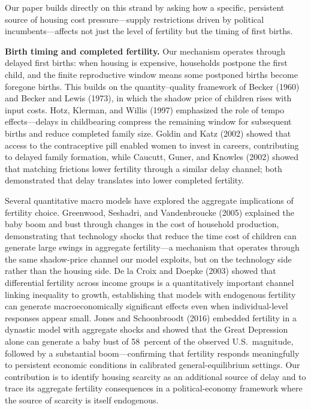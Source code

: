 Our paper builds directly on this strand by asking how a specific, persistent source of housing cost pressure---supply restrictions driven by political incumbents---affects not just the level of fertility but the timing of first births.

\medskip
\noindent\textbf{Birth timing and completed fertility.}
Our mechanism operates through delayed first births: when housing is expensive, households postpone the first child, and the finite reproductive window means some postponed births become foregone births. This builds on the quantity--quality framework of Becker (1960) and Becker and Lewis (1973), in which the shadow price of children rises with input costs. Hotz, Klerman, and Willis (1997) emphasized the role of tempo effects---delays in childbearing compress the remaining window for subsequent births and reduce completed family size. Goldin and Katz (2002) showed that access to the contraceptive pill enabled women to invest in careers, contributing to delayed family formation, while Caucutt, Guner, and Knowles (2002) showed that matching frictions lower fertility through a similar delay channel; both demonstrated that delay translates into lower completed fertility.

Several quantitative macro models have explored the aggregate implications of fertility choice. Greenwood, Seshadri, and Vandenbroucke (2005) explained the baby boom and bust through changes in the cost of household production, demonstrating that technology shocks that reduce the time cost of children can generate large swings in aggregate fertility---a mechanism that operates through the same shadow-price channel our model exploits, but on the technology side rather than the housing side. De la Croix and Doepke (2003) showed that differential fertility across income groups is a quantitatively important channel linking inequality to growth, establishing that models with endogenous fertility can generate macroeconomically significant effects even when individual-level responses appear small. Jones and Schoonbroodt (2016) embedded fertility in a dynastic model with aggregate shocks and showed that the Great Depression alone can generate a baby bust of 58~percent of the observed U.S.\ magnitude, followed by a substantial boom---confirming that fertility responds meaningfully to persistent economic conditions in calibrated general-equilibrium settings. Our contribution is to identify housing scarcity as an additional source of delay and to trace its aggregate fertility consequences in a political-economy framework where the source of scarcity is itself endogenous.


